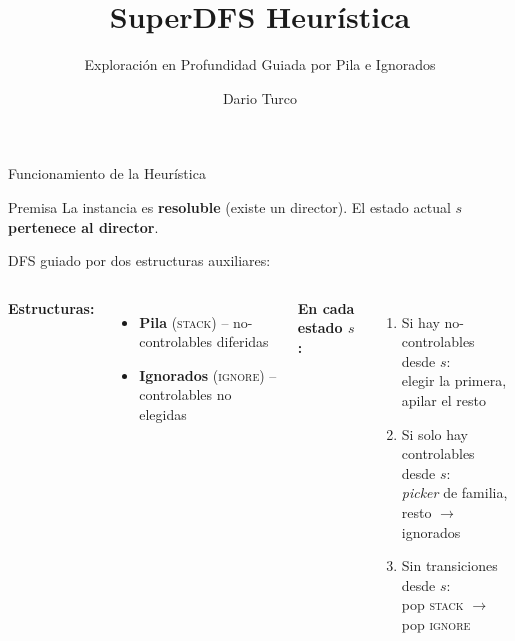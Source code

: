 \documentclass{beamer}
\title{SuperDFS Heur\'istica}
\subtitle{Exploraci\'on en Profundidad Guiada por Pila e Ignorados}
\author{Dario Turco}
\date{}
\begin{document}
\begin{frame}
\titlepage
\end{frame}

\begin{frame}{Funcionamiento de la Heur\'istica}

\begin{alertblock}{Premisa}
La instancia es \textbf{resoluble} (existe un director). El estado actual $s$ \textbf{pertenece al director}.
\end{alertblock}

\medskip
DFS guiado por dos estructuras auxiliares:

\bigskip
\begin{columns}[t]
\textbf{Estructuras:}
\begin{itemize}
  \item \textcolor{cStack}{\textbf{Pila} (\textsc{stack})} -- no-controlables diferidas
  \item \textcolor{cIgnore}{\textbf{Ignorados} (\textsc{ignore})} -- controlables no elegidas
\end{itemize}

\textbf{En cada estado $s$:}
\begin{enumerate}
  \item Si hay no-controlables desde $s$:\\
    elegir la primera, apilar el resto
  \item Si solo hay controlables desde $s$:\\
    \emph{picker} de familia, resto $\to$ ignorados
  \item Sin transiciones desde $s$:\\
    pop \textcolor{cStack}{\textsc{stack}} $\to$ pop \textcolor{cIgnore}{\textsc{ignore}}
\end{enumerate}
\end{columns}

\end{frame}
\end{document}
